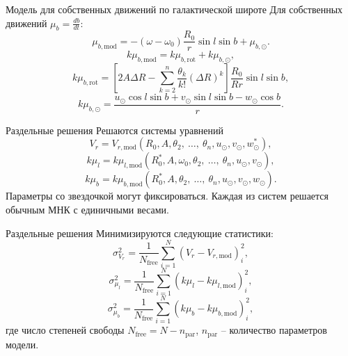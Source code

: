\documentclass[compress]{beamer}
\begin{document}
\begin{frame}{Модель для собственных движений по галактической широте}
Для собственных движений $\mu_b = \frac{db}{dt}$:
\begin{equation}
        \mu_{b, \mathrm{mod}} = - (\omega - \omega_0) \frac{R_0}{r} \sin{l} \sin{b} + \mu_{b, \odot}.
\end{equation}
	\begin{equation}
		k\mu_{b, \mathrm{mod}} = k\mu_{b, \mathrm{rot}} + k\mu_{b, \odot},
	\end{equation}
	\begin{equation}
		k\mu_{b, \mathrm{rot}} = \left[ 2A\Delta R - \sum^n_{k = 2} \frac{\theta_k}{k!} \left( \Delta R \right)^k \right] \frac{R_0}{Rr} \sin{l} \sin{b},
	\end{equation}
	\begin{equation}
                k\mu_{b, \odot} = \frac{u_{\odot}\cos{l}\sin{b} + v_{\odot}\sin{l}\sin{b} - w_{\odot}\cos{b}}{r}.
	\end{equation}
\end{frame}

\begin{frame}{Раздельные решения}
	Решаются системы уравнений
	\begin{equation}
                V_r = V_{r, \mathrm{mod}} (R_0, A, \theta_2, \:\ldots,\: \theta_n, u_{\odot}, v_{\odot}, w_{\odot}^{*}),
	\end{equation}
	\begin{equation}
                k\mu_l = k\mu_{l, \mathrm{mod}} (R_0^{*}, A, \omega_0, \theta_2, \:\ldots,\: \theta_n, u_{\odot}, v_{\odot}),
	\end{equation}
	\begin{equation}
                k\mu_b = k\mu_{b, \mathrm{mod}} (R_0^{*}, A, \theta_2, \:\ldots,\: \theta_n, u_{\odot}, v_{\odot}, w_{\odot}).
	\end{equation}
        Параметры со звездочкой могут фиксироваться. Каждая из систем решается обычным МНК с единичными весами.
\end{frame}

\begin{frame}{Раздельные решения}
        Минимизируются следующие статистики:
	\begin{equation}
                \sigma^2_{V_r} = \frac{1}{N_{\mathrm{free}}} \sum^N_{i = 1} \left( V_r - V_{r, \mathrm{mod}} \right)^2_i,
	\end{equation}
	\begin{equation}
                \sigma^2_{\mu_l} = \frac{1}{N_{\mathrm{free}}} \sum^N_{i = 1} \left( k\mu_l - k\mu_{l, \mathrm{mod}} \right)^2_i,
	\end{equation}
	\begin{equation}
                \sigma^2_{\mu_b} = \frac{1}{N_{\mathrm{free}}} \sum^N_{i = 1} \left( k\mu_b - k\mu_{b, \mathrm{mod}} \right)^2_i,
	\end{equation}
        где число степеней свободы $N_{\mathrm{free}} = N - n_{\mathrm{par}}$, $n_{\mathrm{par}}$ -- количество параметров модели.
\end{frame}
\end{document}
